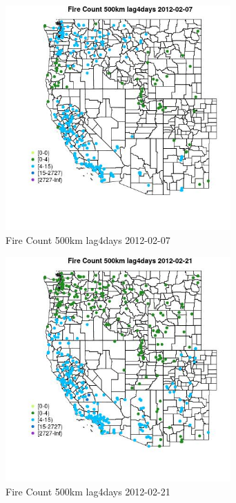 \begin{figure} 
\centering  
\includegraphics[width=0.77\textwidth]{Code_Outputs/Report_ML_input_PM25_Step4_part_f_de_duplicated_aveswNAs_MapObsFire_Count_500km_lag4days2012-02-07.jpg} 
\caption{\label{fig:Report_ML_input_PM25_Step4_part_f_de_duplicated_aveswNAsMapObsFire_Count_500km_lag4days2012-02-07}Fire Count 500km lag4days 2012-02-07} 
\end{figure} 
 

\begin{figure} 
\centering  
\includegraphics[width=0.77\textwidth]{Code_Outputs/Report_ML_input_PM25_Step4_part_f_de_duplicated_aveswNAs_MapObsFire_Count_500km_lag4days2012-02-21.jpg} 
\caption{\label{fig:Report_ML_input_PM25_Step4_part_f_de_duplicated_aveswNAsMapObsFire_Count_500km_lag4days2012-02-21}Fire Count 500km lag4days 2012-02-21} 
\end{figure} 
 

